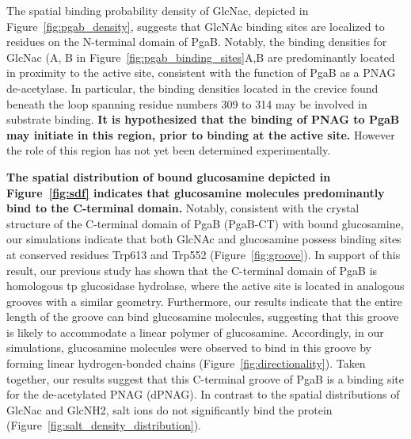 The spatial binding probability density of GlcNac, depicted in Figure~\ref{fig:pgab_density}, suggests that GlcNAc binding sites are localized to residues on the N-terminal domain of PgaB.
Notably, the binding densities for GlcNac (A, B in Figure~\ref{fig:pgab_binding_sites}A,B are predominantly located in proximity to the active site, consistent with the function of PgaB as a PNAG de-acetylase. In particular, the binding densities located in the crevice found beneath the loop spanning residue numbers 309 to 314 may be involved in substrate binding. \textbf{It is hypothesized that the binding of PNAG to PgaB may initiate in this region, prior to binding at the active site.}\cite{Little:2012dp} However the role of this region has not yet been determined experimentally.




\textbf{The spatial distribution of bound glucosamine depicted in Figure~\ref{fig:sdf} indicates that glucosamine molecules predominantly bind to the C-terminal domain.} 
Notably, consistent with the crystal structure of the C-terminal domain of PgaB (PgaB-CT) with bound glucosamine, our simulations indicate that both GlcNAc and glucosamine possess binding sites at conserved residues Trp613 and Trp552  (Figure~\ref{fig:groove}).
In support of this result, our previous study has shown that the C-terminal domain of PgaB is homologous tp glucosidase hydrolase, where the active site is located in analogous grooves with a similar geometry.\cite{Little:2012dp} Furthermore, our results indicate that the entire length of the groove can bind glucosamine molecules, suggesting that this groove is likely to accommodate a linear polymer of glucosamine. Accordingly, in our simulations, glucosamine molecules were observed to bind in this groove by forming linear hydrogen-bonded chains (Figure~\ref{fig:directionality}).  Taken together,  our results suggest that this C-terminal groove of PgaB is a binding site for the de-acetylated PNAG (dPNAG).   In contrast to the spatial distributions of GlcNac and GlcNH2, salt ions do not significantly bind the protein  (Figure~\ref{fig:salt_density_distribution}). 

